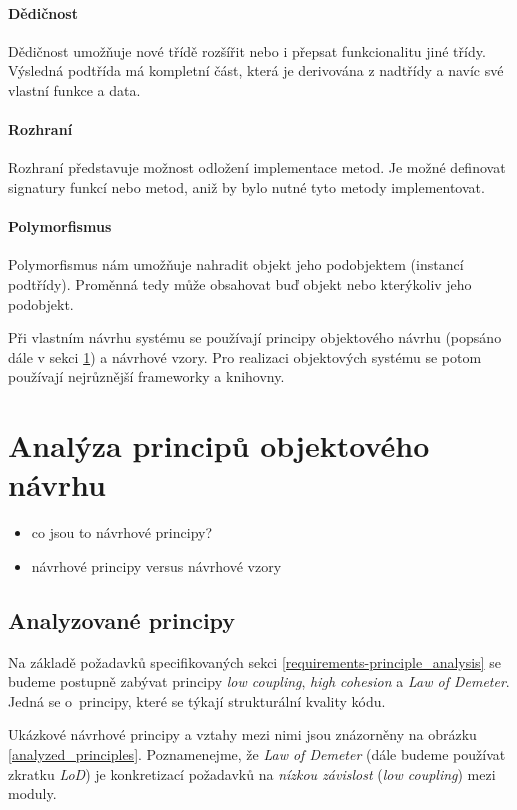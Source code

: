 \paragraph{Dědičnost} Dědičnost umožňuje nové třídě rozšířit nebo i přepsat funkcionalitu jiné třídy. Výsledná podtřída má kompletní část, která je derivována z nadtřídy a navíc své vlastní funkce a data.
\paragraph{Rozhraní} Rozhraní představuje možnost odložení implementace metod. Je možné definovat signatury funkcí nebo metod, aniž by bylo nutné tyto metody implementovat.
\paragraph{Polymorfismus} Polymorfismus nám umožňuje nahradit objekt jeho podobjektem (instancí podtřídy). Proměnná tedy může obsahovat buď objekt nebo kterýkoliv jeho podobjekt.

Při vlastním návrhu systému se používají principy objektového návrhu (popsáno dále v sekci \ref{analysis-oop_design_principles}) a návrhové vzory. Pro realizaci objektových systému se potom používají nejrůznější frameworky a knihovny.

\section{Analýza principů objektového návrhu}
\label{analysis-oop_design_principles}
\begin{itemize}
\item co jsou to návrhové principy?
\item návrhové principy versus návrhové vzory \cite{612257}
\end{itemize}

\subsection{Analyzované principy}
Na základě požadavků specifikovaných sekci \ref{requirements-principle_analysis} se budeme postupně zabývat principy \emph{low coupling}, \emph{high cohesion} a \emph{Law of Demeter}. Jedná se o~principy, které se týkají strukturální kvality kódu.

Ukázkové návrhové principy a vztahy mezi nimi jsou znázorněny na obrázku \ref{analyzed_principles}. Poznamenejme, že \emph{Law of Demeter} (dále budeme používat zkratku \emph{LoD}) je konkretizací požadavků na \emph{nízkou závislost} (\emph{low coupling}) mezi moduly.

